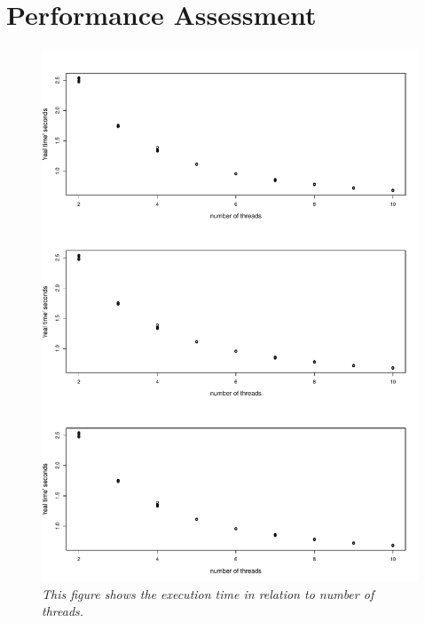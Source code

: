 \documentclass[a4paper,11pt,twoside]{article}
\begin{document}
\section{Performance Assessment}

\begin{figure}
\centering
\includegraphics[width=\textwidth]{perform.pdf}
\caption{\textit{This figure shows the execution time in relation to number of threads.}}
\label{fig:perform}
\end{figure}





\end{document}
